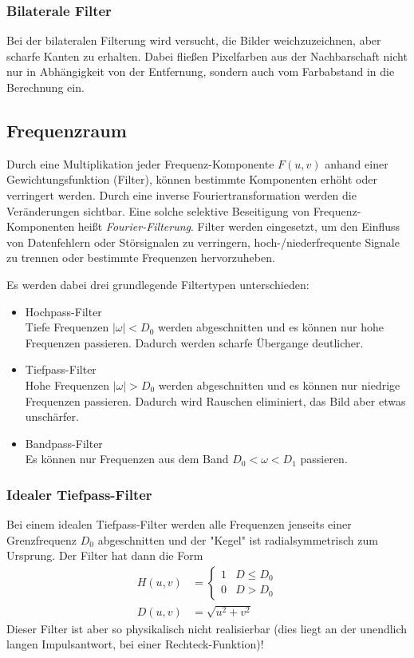 			\subsubsection{Bilaterale Filter}
				Bei der bilateralen Filterung wird versucht, die Bilder weichzuzeichnen, aber scharfe Kanten zu erhalten. Dabei fließen Pixelfarben aus der Nachbarschaft nicht nur in Abhängigkeit von der Entfernung, sondern auch vom Farbabstand in die Berechnung ein.

		\subsection{Frequenzraum}
			Durch eine Multiplikation jeder Frequenz-Komponente \( F(u, v) \) anhand einer Gewichtungsfunktion (Filter), können bestimmte Komponenten erhöht oder verringert werden. Durch eine inverse Fouriertransformation werden die Veränderungen sichtbar. Eine solche selektive Beseitigung von Frequenz-Komponenten heißt \emph{Fourier-Filterung}. Filter werden \bspw eingesetzt, um den Einfluss von Datenfehlern oder Störsignalen zu verringern, hoch-/niederfrequente Signale zu trennen oder bestimmte Frequenzen hervorzuheben.

			Es werden dabei drei grundlegende Filtertypen unterschieden:
			\begin{itemize}
				\item Hochpass-Filter \\ Tiefe Frequenzen \( \lvert \omega \rvert < D_0 \) werden abgeschnitten und es können nur hohe Frequenzen passieren. Dadurch werden scharfe Übergange deutlicher.
				\item Tiefpass-Filter \\ Hohe Frequenzen \( \lvert \omega \rvert > D_0 \) werden abgeschnitten und es können nur niedrige Frequenzen passieren. Dadurch wird Rauschen eliminiert, das Bild aber etwas unschärfer.
				\item Bandpass-Filter \\ Es können nur Frequenzen aus dem Band \( D_0 < \omega < D_1 \) passieren.
			\end{itemize}

			\subsubsection{Idealer Tiefpass-Filter}
				Bei einem idealen Tiefpass-Filter werden alle Frequenzen jenseits einer Grenzfrequenz \( D_0 \) abgeschnitten und der "Kegel" ist radialsymmetrisch zum Ursprung. Der Filter hat dann die Form
				\begin{align*}
					H(u, v) & =
					\begin{cases}
						1 & D \leq D_0 \\
						0 & D > D_0
					\end{cases}               \\
					D(u, v) & = \sqrt{u^2 + v^2}
				\end{align*}
				Dieser Filter ist aber so physikalisch nicht realisierbar (dies liegt an der unendlich langen Impulsantwort, \zB bei einer Rechteck-Funktion)!

